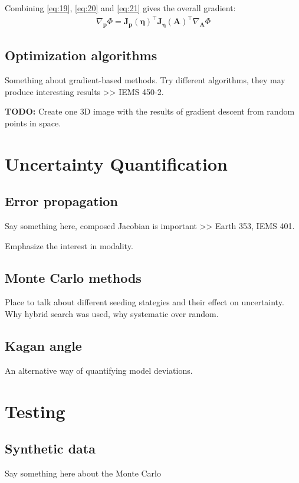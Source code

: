 \documentclass[preprint]{seismica}
\begin{document}
    Combining \ref{eq:19}, \ref{eq:20} and \ref{eq:21} gives the overall gradient:
    \begin{align} \label{eq:22}
      \nabla_{\bm{p}}\Phi = \bm{J_p}(\bm{\eta})^\top \bm{J_\eta}(\bm{A})^\top \nabla_{\bm{A}}\Phi
    \end{align}

  \subsection{Optimization algorithms}
    Something about gradient-based methods. Try different algorithms, they may produce
    interesting results >> IEMS 450-2.

    \noindent \textbf{TODO:} Create one 3D image with the results of gradient descent from random points in space.


\section{Uncertainty Quantification} \label{sec:uncertainty}

    \subsection{Error propagation}
      Say something here, composed Jacobian is important >> Earth 353, IEMS 401.

      \noindent Emphasize the interest in modality.

    \subsection{Monte Carlo methods}
      Place to talk about different seeding stategies and their effect on uncertainty.
      Why hybrid search was used, why systematic over random.
    
    \subsection{Kagan angle}
      An alternative way of quantifying model deviations.


\section{Testing} \label{sec:example}

    \subsection{Synthetic data}
      Say something here about the Monte Carlo
    
\end{document}
